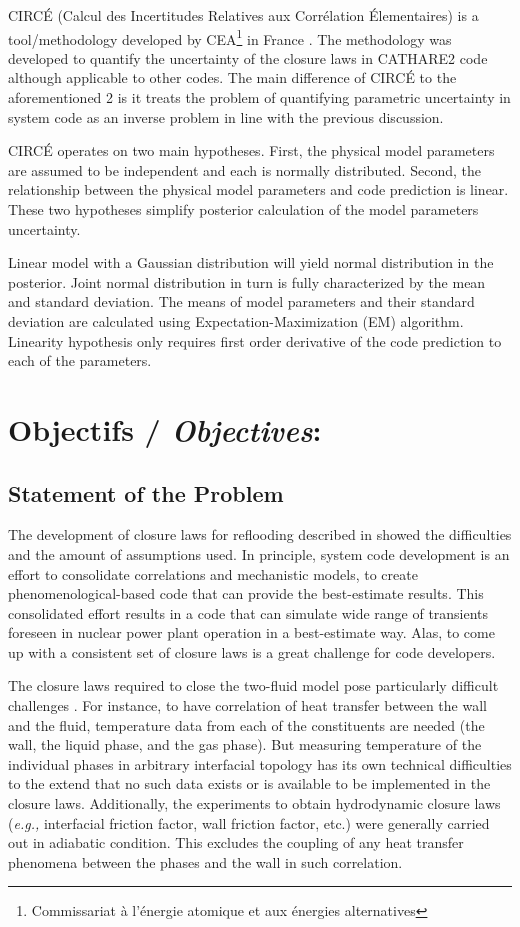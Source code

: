\documentclass[11pt,titlepage]{article}
\begin{document}
CIRCÉ (Calcul des Incertitudes Relatives aux Corrélation Élementaires) is a tool/methodology developed by CEA\footnote{Commissariat à l'énergie atomique et aux énergies alternatives} in France \cite{deCrecy2001}.
The methodology was developed to quantify the uncertainty of the closure laws in CATHARE2 code although applicable to other codes. 
The main difference of CIRCÉ to the aforementioned 2 is it treats the problem of quantifying parametric uncertainty in system code as an inverse problem in line with the previous discussion. 

CIRCÉ operates on two main hypotheses.
First, the physical model parameters are assumed to be independent and each is normally distributed.
Second, the relationship between the physical model parameters and code prediction is linear.
These two hypotheses simplify posterior calculation of the model parameters uncertainty.

Linear model with a Gaussian distribution will yield normal distribution in the posterior.
Joint normal distribution in turn is fully characterized by the mean and standard deviation.
The means of model parameters and their standard deviation are calculated using Expectation-Maximization (EM) algorithm.
Linearity hypothesis only requires first order derivative of the code prediction to each of the parameters.

\newpage
\section{Objectifs /  {\large\textit{Objectives}}:}

\subsection{Statement of the Problem}

The development of closure laws for reflooding described in \cite{Nelson1992} showed the difficulties and the amount of assumptions used. 
In principle, system code development is an effort to consolidate correlations and mechanistic models, to create phenomenological-based code that can provide the best-estimate results. 
This consolidated effort results in a code that can simulate wide range of transients foreseen in nuclear power plant operation in a best-estimate way. 
Alas, to come up with a consistent set of closure laws is a great challenge for code developers.

The closure laws required to close the two-fluid model pose particularly difficult challenges \cite{Wulff2007}. 
For instance, to have correlation of heat transfer between the wall and the fluid, temperature data from each of the constituents are needed (the wall, the liquid phase, and the gas phase). 
But measuring temperature of the individual phases in arbitrary interfacial topology has its own technical difficulties to the extend that no such data exists or is available to be implemented in the closure laws.
Additionally, the experiments to obtain hydrodynamic closure laws (\textit{e.g.,} interfacial friction factor, wall friction factor, etc.) were generally carried out in adiabatic condition. 
This excludes the coupling of any heat transfer phenomena between the phases and the wall in such correlation. 
\end{document}
